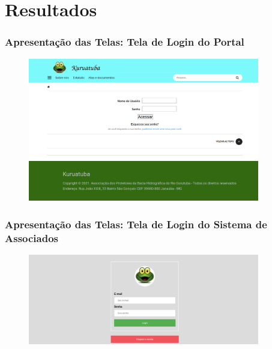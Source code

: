 \documentclass{beamer}
\begin{document}


\section{Resultados}
\begin{frame}
    \frametitle{Apresentação das Telas: Tela de Login do Portal}
    \begin{figure}[htb]
        \centering
        \includegraphics[width=0.9\textwidth]{../figuras/kuruatuba_portal_login.png}
        \label{fig:login-portal}
    \end{figure}
\end{frame}

\begin{frame}
    \frametitle{Apresentação das Telas: Tela de Login do Sistema de Associados}
    \begin{figure}[htb]
        \centering
        \includegraphics[width=0.9\textwidth]{../figuras/kuruatuba_sistema_login.png}
        \label{fig:login-sistema}
    \end{figure}
\end{frame}
\end{document}
